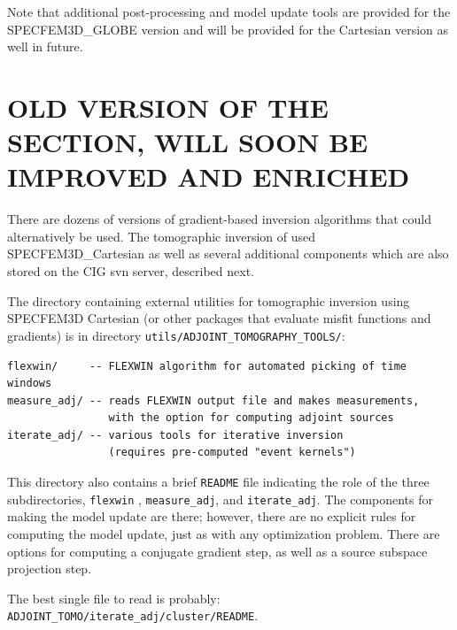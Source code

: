 Note that additional post-processing and model update tools are provided for the SPECFEM3D\_GLOBE version and will be provided for the Cartesian version as well in future.


\section{OLD VERSION OF THE SECTION, WILL SOON BE IMPROVED AND ENRICHED}

There are dozens of versions of gradient-based inversion
algorithms that could alternatively be used. The tomographic inversion
of \citet{TaLiMaTr09,TaLiMaTr2010} used SPECFEM3D\_Cartesian as well
as several additional components which are also stored on the CIG
svn server, described next.

The directory containing external utilities for tomographic inversion using
SPECFEM3D Cartesian (or other packages that evaluate misfit functions
and gradients) is in directory \texttt{utils/ADJOINT\_TOMOGRAPHY\_TOOLS/}:
\begin{verbatim}
flexwin/     -- FLEXWIN algorithm for automated picking of time windows
measure_adj/ -- reads FLEXWIN output file and makes measurements,
                with the option for computing adjoint sources
iterate_adj/ -- various tools for iterative inversion
                (requires pre-computed "event kernels")
\end{verbatim}
This directory also contains
a brief \verb+README+ file indicating the role of the three subdirectories,
\verb+flexwin+ \citep{Maggi2009}, \verb+measure_adj+, and \verb+iterate_adj+.
The components for making the model update are there; however, there
are no explicit rules for computing the model update, just as with
any optimization problem. There are options for computing a conjugate
gradient step, as well as a source subspace projection step.

The best single file to read is probably: \verb+ADJOINT_TOMO/iterate_adj/cluster/README+.


